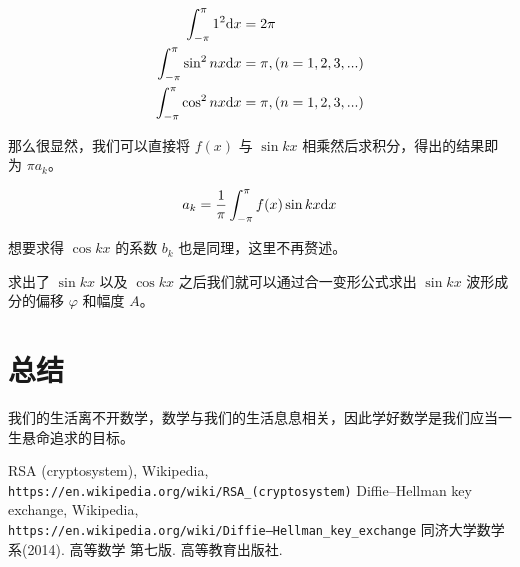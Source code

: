 \documentclass[hyperref,UTF8,12pt,a4paper]{ctexart}
\begin{document}
$$
\begin{aligned}
\int_{-\pi}^{\pi}1^2 {\rm d} x &= 2\pi \\
\int_{-\pi}^{\pi}\sin^2 nx {\rm d} x &= \pi, (n = 1, 2, 3, ...) \\
\int_{-\pi}^{\pi}\cos^2 nx {\rm d} x &= \pi, (n = 1, 2, 3, ...) \\
\end{aligned}
$$

那么很显然，我们可以直接将 $f(x)$ 与 $\sin kx$ 相乘然后求积分，得出的结果即为 $\pi a_k$。

$$
a_k = \frac{1}{\pi}\int_{-\pi}^{\pi}f(x)\sin kx {\rm d}x
$$

想要求得 $\cos kx$ 的系数 $b_k$ 也是同理，这里不再赘述。

求出了 $\sin kx$ 以及 $\cos kx$ 之后我们就可以通过合一变形公式求出 $\sin kx$ 波形成分的偏移 $\varphi$ 和幅度 $A$。

\section{总结}

我们的生活离不开数学，数学与我们的生活息息相关，因此学好数学是我们应当一生悬命追求的目标。

\newpage



\begin{thebibliography}{99}
 RSA (cryptosystem), Wikipedia, \\
\texttt{https://en.wikipedia.org/wiki/RSA\_(cryptosystem)}
 Diffie–Hellman key exchange, Wikipedia, \\
\texttt{https://en.wikipedia.org/wiki/Diffie–Hellman\_key\_exchange}
 同济大学数学系(2014). 高等数学 第七版. 高等教育出版社.
\end {thebibliography}
\end{document}
